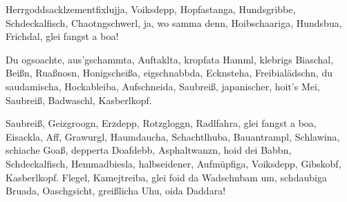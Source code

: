 \documentclass[paper=a4, 12pt, pagesize, parskip=half, DIV=calc]{scrartcl}
\begin{document}
Herrgoddsacklzementfixlujja, Voiksdepp, Hopfastanga, Hundsgribbe, Schdeckalfisch, Chaotngschwerl, ja, wo samma denn, Hoibschaariga, Hundsbua, Frichdal, glei fangst a boa!

Du ogsoachte, aus’gschammta, Auftaklta, kropfata Hamml, klebrigs Biaschal, Beißn, Ruaßnosn, Honigscheißa, eigschnabbda, Ecknsteha, Freibialädschn, du saudamischa, Hockableiba, Aufschneida, Saubreiß, japanischer, hoit’s Mei, Saubreiß, Badwaschl, Kasberlkopf.

Saubreiß, Geizgroogn, Erzdepp, Rotzgloggn, Radlfahra, glei fangst a boa, Eisackla, Aff, Grawurgl, Haumdaucha, Schachtlhuba, Bauantrampl, Schlawina, schiache Goaß, depperta Doafdebb, Asphaltwanzn, hoid dei Babbn, Schdeckalfisch, Hemmadbiesla, halbseidener, Aufmüpfiga, Voiksdepp, Gibskobf, Kasberlkopf.\newline
\linebreak
Flegel, Kamejtreiba, glei foid da Wadschnbam um, schdaubiga Bruada, Oaschgsicht, greißlicha Uhu, oida Daddara!
\end{document}
